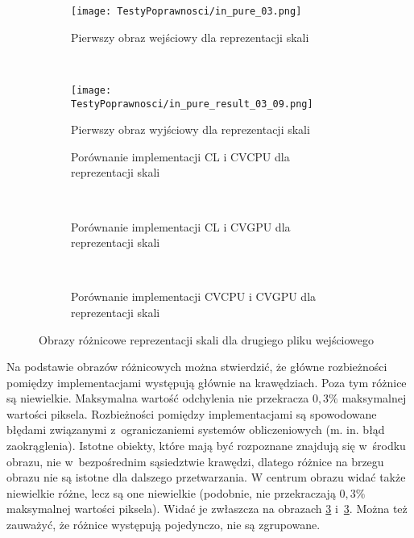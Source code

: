 \begin{figure}[h]
\begin{center}
\begin{subfigure}[t]{0.3\textwidth}
\texttt{[image: TestyPoprawnosci/in\_pure\_03.png]}
\caption{Pierwszy obraz wejściowy dla reprezentacji skali}
\label{fig:valPure03}
\end{subfigure}
~
\begin{subfigure}[t]{0.3\textwidth}
\begin{center}
\texttt{[image: TestyPoprawnosci/in\_pure\_result\_03\_09.png]}
\end{center}
\caption{Pierwszy obraz wyjściowy dla reprezentacji skali}
\label{fig:valPure03}
\end{subfigure}
\end{center}

\begin{subfigure}[t]{0.3\textwidth}
	\centering
	\setlength\fboxsep{0pt}
	\setlength\fboxrule{0.5pt}
	\caption{Porównanie implementacji CL i CVCPU dla reprezentacji skali}
	\label{fig:valPure3CLCVCPU}
\end{subfigure}
~
\begin{subfigure}[t]{0.3\textwidth}
	\centering
	\setlength\fboxsep{0pt}
	\setlength\fboxrule{0.5pt}
	\caption{Porównanie implementacji CL i CVGPU dla reprezentacji skali}
	\label{fig:valPure3CLCVGPU}
\end{subfigure}
~
\begin{subfigure}[t]{0.3\textwidth}
	\centering
	\setlength\fboxsep{0pt}
	\setlength\fboxrule{0.5pt}
	\caption{Porównanie implementacji CVCPU i CVGPU dla reprezentacji skali}
	\label{fig:valPure3CVCPUCVGPU}                 
\end{subfigure}
\caption{Obrazy różnicowe reprezentacji skali dla drugiego pliku wejściowego}

\label{fig:valPure3}
\end{figure}

Na podstawie obrazów różnicowych można stwierdzić, że główne rozbieżności pomiędzy implementacjami występują głównie na krawędziach. Poza tym różnice są niewielkie. Maksymalna wartość odchylenia nie przekracza $ 0,3\% $ maksymalnej wartości piksela. Rozbieżności pomiędzy implementacjami są spowodowane błędami związanymi z~ograniczaniemi systemów obliczeniowych (m. in. błąd zaokrąglenia). Istotne obiekty, które mają być rozpoznane znajdują się w~środku obrazu, nie w~bezpośrednim sąsiedztwie krawędzi, dlatego różnice na brzegu obrazu nie są istotne dla dalszego przetwarzania. W centrum obrazu widać także niewielkie różne, lecz są one niewielkie (podobnie, nie przekraczają $ 0,3\% $ maksymalnej wartości piksela). Widać je zwłaszcza na obrazach \ref{fig:valPure3CLCVCPU} i~\ref{fig:valPure3CLCVCPU}. Można też zauważyć, że różnice występują pojedynczo, nie są zgrupowane.

